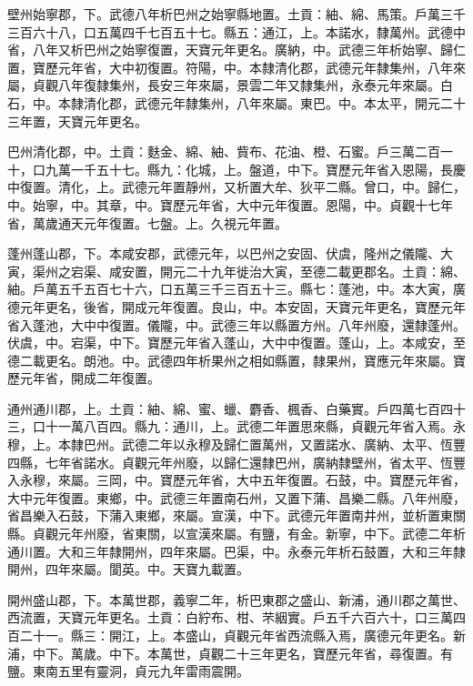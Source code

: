 \begin{pinyinscope}
 壁州始寧郡，下。武德八年析巴州之始寧縣地置。土貢：紬、綿、馬策。戶萬三千三百六十八，口五萬四千七百五十七。縣五：通江，上。本諾水，隸萬州。武德中省，八年又析巴州之始寧復置，天寶元年更名。廣納，中。武德三年析始寧、歸仁置，寶歷元年省，大中初復置。符陽，中。本隸清化郡，武德元年隸集州，八年來屬，貞觀八年復隸集州，長安三年來屬，景雲二年又隸集州，永泰元年來屬。白石，中。本隸清化郡，武德元年隸集州，八年來屬。東巴。中。本太平，開元二十三年置，天寶元年更名。



 巴州清化郡，中。土貢：麩金、綿、紬、貲布、花油、橙、石蜜。戶三萬二百一十，口九萬一千五十七。縣九：化城，上。盤道，中下。寶歷元年省入恩陽，長慶中復置。清化，上。武德元年置靜州，又析置大牟、狄平二縣。曾口，中。歸仁，中。始寧，中。其章，中。寶歷元年省，大中元年復置。恩陽，中。貞觀十七年省，萬歲通天元年復置。七盤。上。久視元年置。



 蓬州蓬山郡，下。本咸安郡，武德元年，以巴州之安固、伏虞，隆州之儀隴、大寅，渠州之宕渠、咸安置，開元二十九年徙治大寅，至德二載更郡名。土貢：綿、紬。戶萬五千五百七十六，口五萬三千三百五十三。縣七：蓬池，中。本大寅，廣德元年更名，後省，開成元年復置。良山，中。本安固，天寶元年更名，寶歷元年省入蓬池，大中中復置。儀隴，中。武德三年以縣置方州。八年州廢，還隸蓬州。伏虞，中。宕渠，中下。寶歷元年省入蓬山，大中中復置。蓬山，上。本咸安，至德二載更名。朗池。中。武德四年析果州之相如縣置，隸果州，寶應元年來屬。寶歷元年省，開成二年復置。



 通州通川郡，上。土貢：紬、綿、蜜、蠟、麝香、楓香、白藥實。戶四萬七百四十三，口十一萬八百四。縣九：通川，上。武德二年置思來縣，貞觀元年省入焉。永穆，上。本隸巴州。武德二年以永穆及歸仁置萬州，又置諾水、廣納、太平、恆豐四縣，七年省諾水。貞觀元年州廢，以歸仁還隸巴州，廣納隸壁州，省太平、恆豐入永穆，來屬。三岡，中。寶歷元年省，大中五年復置。石鼓，中。寶歷元年省，大中元年復置。東鄉，中。武德三年置南石州，又置下蒲、昌樂二縣。八年州廢，省昌樂入石鼓，下蒲入東鄉，來屬。宣漢，中下。武德元年置南井州，並析置東關縣。貞觀元年州廢，省東關，以宣漢來屬。有鹽，有金。新寧，中下。武德二年析通川置。大和三年隸開州，四年來屬。巴渠，中。永泰元年析石鼓置，大和三年隸開州，四年來屬。閬英。中。天寶九載置。



 開州盛山郡，下。本萬世郡，義寧二年，析巴東郡之盛山、新浦，通川郡之萬世、西流置，天寶元年更名。土貢：白紵布、柑、芣絪實。戶五千六百六十，口三萬四百二十一。縣三：開江，上。本盛山，貞觀元年省西流縣入焉，廣德元年更名。新浦，中下。萬歲。中下。本萬世，貞觀二十三年更名，寶歷元年省，尋復置。有鹽。東南五里有靈洞，貞元九年雷雨震開。




\end{pinyinscope}
